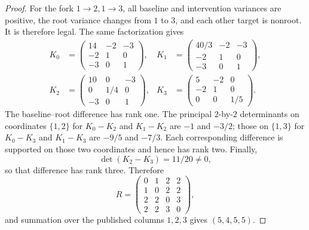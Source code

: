 \documentclass{article}
\begin{document}
\begin{proof}
For the fork \(1\to2,1\to3\), all baseline and intervention variances are positive, the root variance changes from \(1\) to \(3\), and each other target is nonroot.  It is therefore legal.  The same factorization gives
\[
 \begin{aligned}
 K_0&=\begin{pmatrix}14&-2&-3\\-2&1&0\\-3&0&1\end{pmatrix},&
 K_1&=\begin{pmatrix}40/3&-2&-3\\-2&1&0\\-3&0&1\end{pmatrix},\\
 K_2&=\begin{pmatrix}10&0&-3\\0&1/4&0\\-3&0&1\end{pmatrix},&
 K_3&=\begin{pmatrix}5&-2&0\\-2&1&0\\0&0&1/5\end{pmatrix}.
 \end{aligned}                                               \tag{29}
\]
The baseline--root difference has rank one.  The principal \(2\)-by-\(2\) determinants on coordinates \(\{1,2\}\) for \(K_0-K_2\) and \(K_1-K_2\) are \(-1\) and \(-3/2\); those on \(\{1,3\}\) for \(K_0-K_3\) and \(K_1-K_3\) are \(-9/5\) and \(-7/3\).  Each corresponding difference is supported on those two coordinates and hence has rank two.  Finally,
\[
 \det(K_2-K_3)=11/20\neq0,
\]
so that difference has rank three.  Therefore
\[
 R=\begin{pmatrix}
 0&1&2&2\\1&0&2&2\\2&2&0&3\\2&2&3&0
 \end{pmatrix},
\]
and summation over the published columns \(1,2,3\) gives \((5,4,5,5)\).


\end{proof}
\end{document}
